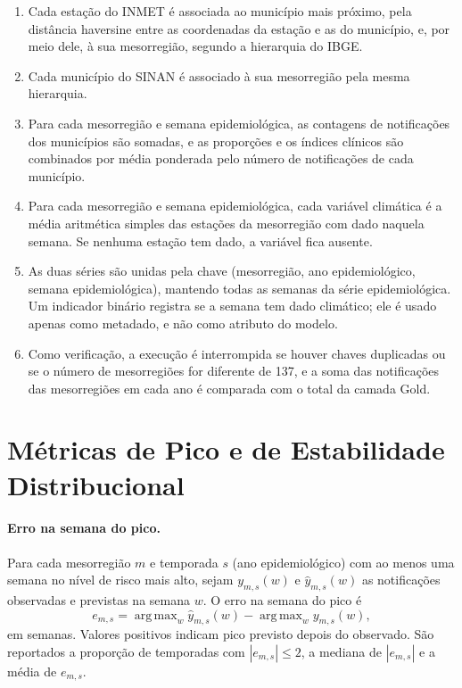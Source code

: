 \begin{apendicesenv}
\begin{enumerate}
    \item Cada estação do INMET é associada ao município mais próximo, pela distância haversine entre as coordenadas da estação e as do município, e, por meio dele, à sua mesorregião, segundo a hierarquia do IBGE.
    \item Cada município do SINAN é associado à sua mesorregião pela mesma hierarquia.
    \item Para cada mesorregião e semana epidemiológica, as contagens de notificações dos municípios são somadas, e as proporções e os índices clínicos são combinados por média ponderada pelo número de notificações de cada município.
    \item Para cada mesorregião e semana epidemiológica, cada variável climática é a média aritmética simples das estações da mesorregião com dado naquela semana. Se nenhuma estação tem dado, a variável fica ausente.
    \item As duas séries são unidas pela chave (mesorregião, ano epidemiológico, semana epidemiológica), mantendo todas as semanas da série epidemiológica. Um indicador binário registra se a semana tem dado climático; ele é usado apenas como metadado, e não como atributo do modelo.
    \item Como verificação, a execução é interrompida se houver chaves duplicadas ou se o número de mesorregiões for diferente de 137, e a soma das notificações das mesorregiões em cada ano é comparada com o total da camada Gold.
\end{enumerate}

\section{Métricas de Pico e de Estabilidade Distribucional}
\label{ap:metricas}

\paragraph{Erro na semana do pico.} Para cada mesorregião $m$ e temporada $s$ (ano epidemiológico) com ao menos uma semana no nível de risco mais alto, sejam $y_{m,s}(w)$ e $\hat{y}_{m,s}(w)$ as notificações observadas e previstas na semana $w$. O erro na semana do pico é
\begin{equation}
e_{m,s} = \mathop{\mathrm{arg\,max}}_{w} \hat{y}_{m,s}(w) - \mathop{\mathrm{arg\,max}}_{w} y_{m,s}(w),
\end{equation}
em semanas. Valores positivos indicam pico previsto depois do observado. São reportados a proporção de temporadas com $|e_{m,s}| \leq 2$, a mediana de $|e_{m,s}|$ e a média de $e_{m,s}$.


\end{apendicesenv}
